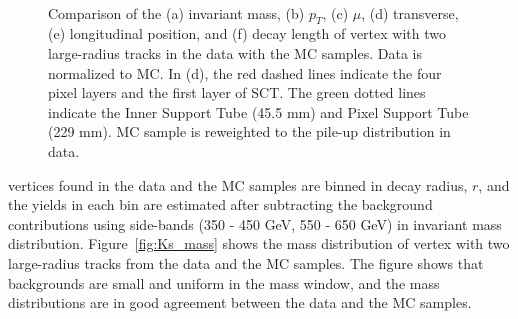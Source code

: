 \begin{figure}[!htb]
     \\
    \caption{Comparison of the (a) invariant mass, (b) $p_{T}$, (c) $\mu$, (d) transverse, (e) longitudinal position, and (f) decay length of \Ks vertex with two large-radius tracks in the data with the MC samples. Data is normalized to MC. In (d), the red dashed lines indicate the four pixel layers and the first layer of SCT. The green dotted lines indicate the Inner Support Tube (45.5 mm) and Pixel Support Tube (229 mm). MC sample is reweighted to the pile-up distribution in data.}
    \label{fig:Ks_data_MC}
\end{figure}

\Ks vertices found in the data and the MC samples are binned in decay radius, $r$, and the \Ks yields in each bin are estimated after subtracting the background contributions using side-bands (350 - 450 GeV, 550 - 650 GeV) in invariant mass distribution. Figure~\ref{fig:Ks_mass} shows the mass distribution of \Ks vertex with two large-radius tracks from the data and the MC samples. The figure shows that backgrounds are small and uniform in the mass window, and the mass distributions are in good agreement between the data and the MC samples.

